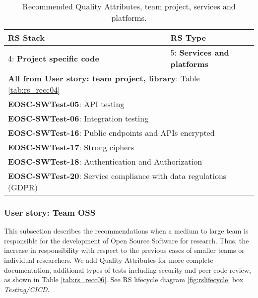 \begin{center}
\begin{table}[h]

  \small
  \begin{tabular}{|p{0.65\linewidth}|p{0.35\linewidth}|} \hline

    \textbf{RS Stack} & \textbf{RS Type} \\ \hline \hline
    4: \textbf{Project specific code} &
    5: \textbf{Services and platforms} \\ \hline \hline
    \multicolumn{2}{|l|}{\textbf{All from User story: team project, library}: Table \ref{tab:rs_recc04}} \\ \hline
    \multicolumn{2}{|l|}{\textbf{EOSC-SWTest-05}: API testing} \\ \hline
    \multicolumn{2}{|l|}{\textbf{EOSC-SWTest-06}: Integration testing} \\ \hline
    \multicolumn{2}{|l|}{\textbf{EOSC-SWTest-16}: Public endpoints and APIs encrypted} \\ \hline
    \multicolumn{2}{|l|}{\textbf{EOSC-SWTest-17}: Strong ciphers} \\ \hline
    \multicolumn{2}{|l|}{\textbf{EOSC-SWTest-18}: Authentication and Authorization} \\ \hline
    \multicolumn{2}{|l|}{\textbf{EOSC-SWTest-20}: Service compliance with data regulations (GDPR)} \\ \hline

  \end{tabular}
  \caption{Recommended Quality Attributes, team project, services and platforms.}
  \label{tab:rs_recc05}
\end{table}
\end{center}

\subsubsection{User story: Team OSS}

This subsection describes the recommendations when a medium to large team is responsible for the development of Open Source Software for research. Thus, the increase in responsibility with respect to the previous cases of smaller teams or individual researchers. We add Quality Attributes for more complete documentation, additional types of tests including security and peer code review, as shown in Table \ref{tab:rs_recc06}. See RS lifecycle diagram \ref{fig:rslifecycle} box \textit{Testing/CICD}.

